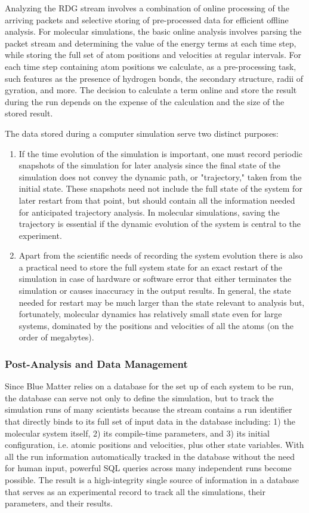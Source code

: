 \documentclass[doublespacing]{elsart}
\begin{document}
Analyzing the RDG stream involves a combination of online processing
of the arriving packets and selective storing of pre-processed data
for efficient offline analysis.  For molecular simulations, the basic
online analysis involves parsing the packet stream and determining the
value of the energy terms at each time step, while storing the full
set of atom positions and velocities at regular intervals.  For each
time step containing atom positions we calculate, as a pre-processing
task, such features as the presence of hydrogen bonds, the secondary
structure, radii of gyration, and more.  The decision to calculate a
term online and store the result during the run depends on the expense
of the calculation and the size of the stored result.

The data stored during a computer simulation serve two distinct
purposes:
\begin{enumerate}
\item If the time evolution of the simulation is important, one
must record periodic snapshots of the simulation for later analysis
since the final state of the simulation does not convey the dynamic
path, or "trajectory," taken from the initial state.  These snapshots
need not include the full state of the system for later restart from
that point, but should contain all the information needed for
anticipated trajectory analysis.  In molecular simulations, saving the
trajectory is essential if the dynamic evolution of the system is
central to the experiment.
\item Apart from the scientific needs of
recording the system evolution there is also a practical need to store
the full system state for an exact restart of the simulation in case
of hardware or software error that either terminates the simulation or
causes inaccuracy in the output results.  In general, the state needed
for restart may be much larger than the state relevant to analysis
but, fortunately, molecular dynamics has relatively small state even
for large systems, dominated by the positions and velocities of all
the atoms (on the order of megabytes).
\end{enumerate}

\subsubsection{Post-Analysis and Data Management}

Since Blue Matter relies on a database for the set up of each system
to be run, the database can serve not only to define the simulation,
but to track the simulation runs of many scientists because the stream
contains a run identifier that directly binds to its full set of input
data in the database including: 1) the molecular system itself, 2) its
compile-time parameters, and 3) its initial configuration, i.e. atomic
positions and velocities, plus other state variables.  With all the
run information automatically tracked in the database without the need
for human input, powerful SQL queries across many independent runs
become possible.  The result is a high-integrity single source of
information in a database that serves as an experimental record to
track all the simulations, their parameters, and their results.
\end{document}
